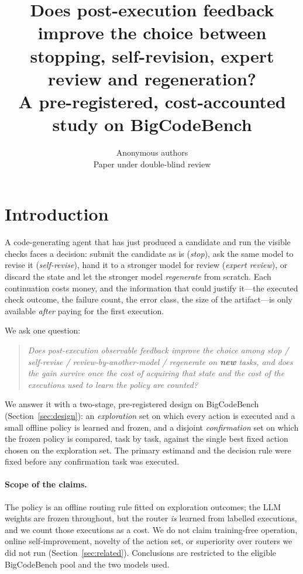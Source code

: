 \documentclass{article}
\title{Does post-execution feedback improve the choice between stopping, self-revision, expert review and regeneration? \\
A pre-registered, cost-accounted study on BigCodeBench}
\author{Anonymous authors \\ Paper under double-blind review}
\newif\ifdraftmode
\newcommand{\draftnote}[1]{\ifdraftmode{\color{red}\textbf{[DRAFT: #1]}}\else\PackageError{main}{draftnote left in submission build: #1}{}\fi}
\begin{document}
\maketitle

\begin{abstract}
\draftnote{Abstract is written after the pre-registered analysis (decision package, 2026-09-17). Do not register a placeholder. The
registered abstract must contain only results verified in \texttt{evidence/week2} at registration time; see
\texttt{evidence/iclr\_2027/decision\_20260917.md} for the two admissible variants.}
\end{abstract}

\section{Introduction}
\label{sec:intro}
A code-generating agent that has just produced a candidate and run the visible checks faces a decision: submit the candidate as is
(\emph{stop}), ask the same model to revise it (\emph{self-revise}), hand it to a stronger model for review (\emph{expert review}), or
discard the state and let the stronger model \emph{regenerate} from scratch. Each continuation costs money, and the information that
could justify it---the executed check outcome, the failure count, the error class, the size of the artifact---is only available
\emph{after} paying for the first execution.

We ask one question:
\begin{quote}
\emph{Does post-execution observable feedback improve the choice among stop / self-revise / review-by-another-model / regenerate on
\textbf{new} tasks, and does the gain survive once the cost of acquiring that state and the cost of the executions used to learn the
policy are counted?}
\end{quote}
We answer it with a two-stage, pre-registered design on BigCodeBench~\citep{zhuo2024bigcodebench} (Section~\ref{sec:design}):
an \emph{exploration} set on which every action is executed and a small offline policy is learned and frozen, and a disjoint
\emph{confirmation} set on which the frozen policy is compared, task by task, against the single best fixed action chosen on the
exploration set. The primary estimand and the decision rule were fixed before any confirmation task was executed.

\paragraph{Scope of the claims.} The policy is an offline routing rule fitted on exploration outcomes; the LLM weights are frozen
throughout, but the router \emph{is} learned from labelled executions, and we count those executions as a cost. We do not claim
training-free operation, online self-improvement, novelty of the action set, or superiority over routers we did not run
(Section~\ref{sec:related}). Conclusions are restricted to the eligible BigCodeBench pool and the two models used.
\draftnote{Numbers and the contribution list are filled from the decision package only.}
\end{document}
